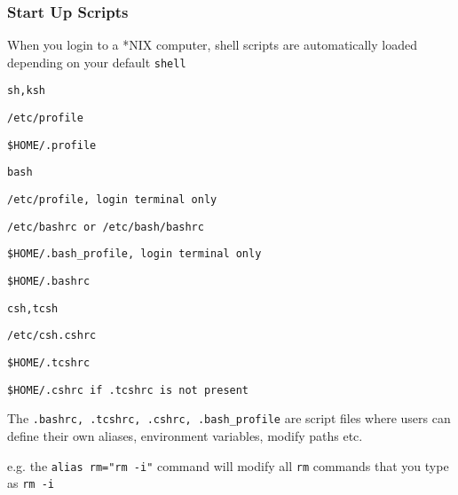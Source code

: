 \documentclass[slidestop,mathserif,compress,xcolor=svgnames]{beamer}
\begin{document}
\begin{frame}
  \frametitle{\small Start Up Scripts}
  \begin{itemize}
    {\scriptsize
    \item When you login to a *NIX computer, shell scripts are automatically loaded depending on your default \texttt{shell}
    \item \texttt{sh,ksh}
    \begin{enumerate}
      {\scriptsize
        \item \texttt{/etc/profile}
        \item \texttt{\$HOME/.profile}
      }
    \end{enumerate}
    \item \texttt{bash}
    \begin{enumerate}
      {\scriptsize
        \item \texttt{/etc/profile, login terminal only}
        \item \texttt{/etc/bashrc or /etc/bash/bashrc}
        \item \texttt{\$HOME/.bash\_profile, login terminal only}
        \item \texttt{\$HOME/.bashrc}
      }
    \end{enumerate}
    \item \texttt{csh,tcsh}
    \begin{enumerate}
      {\scriptsize
        \item \texttt{/etc/csh.cshrc}
        \item \texttt{\$HOME/.tcshrc}
        \item \texttt{\$HOME/.cshrc if .tcshrc is not present}
      }
    \end{enumerate}
    \item The \texttt{.bashrc, .tcshrc, .cshrc, .bash\_profile} are script files where users can define their own aliases, environment variables, modify paths etc.
    \item e.g. the \texttt{alias rm="rm -i"} command will modify all \texttt{rm} commands that you type as \texttt{rm -i} 
    }
  \end{itemize}
\end{frame}
\end{document}
